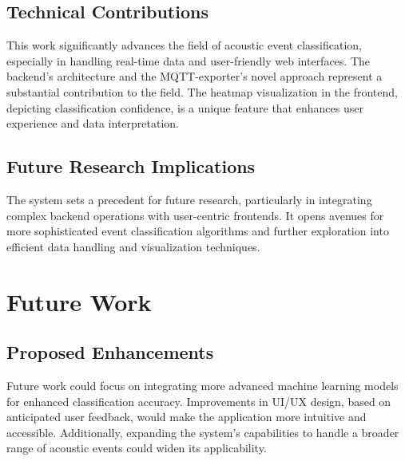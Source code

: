 \subsection{Technical Contributions}

This work significantly advances the field of acoustic event classification, especially in handling real-time data and user-friendly web interfaces. The backend’s architecture and the MQTT-exporter’s novel approach represent a substantial contribution to the field. The heatmap visualization in the frontend, depicting classification confidence, is a unique feature that enhances user experience and data interpretation.

\subsection{Future Research Implications}

The system sets a precedent for future research, particularly in integrating complex backend operations with user-centric frontends. It opens avenues for more sophisticated event classification algorithms and further exploration into efficient data handling and visualization techniques.

\section{Future Work}

\subsection{Proposed Enhancements}

Future work could focus on integrating more advanced machine learning models for enhanced classification accuracy. Improvements in UI/UX design, based on anticipated user feedback, would make the application more intuitive and accessible. Additionally, expanding the system’s capabilities to handle a broader range of acoustic events could widen its applicability.

